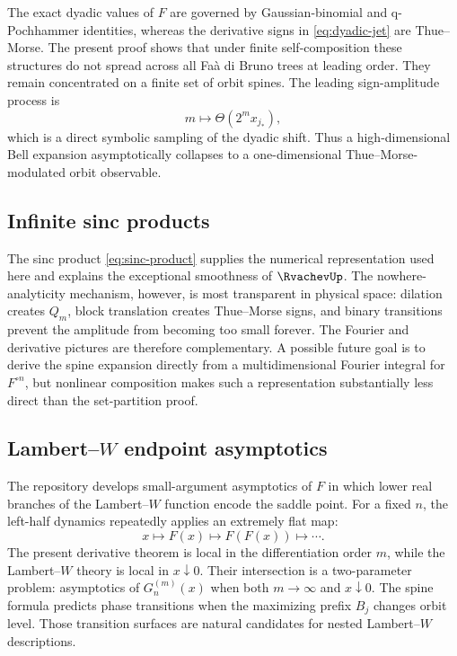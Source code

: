 \documentclass[11pt,oneside]{article}
\theoremstyle{definition}
\theoremstyle{remark}
\newcommand{\comp}{\mathbin{\circ}}
\newcommand{\ThetaF}{\Theta}
\begin{document}
The exact dyadic values of $F$ are governed by Gaussian-binomial and q-Pochhammer
identities, whereas the derivative signs in \eqref{eq:dyadic-jet} are Thue--Morse.
The present proof shows that under finite self-composition these structures do not
spread across all Fa\`a di Bruno trees at leading order.  They remain concentrated on
a finite set of orbit spines.  The leading sign-amplitude process is
\begin{equation}
 m\longmapsto
 \ThetaF(2^m x_{j_*}),
 \label{eq:leading-symbolic-process}
\end{equation}
which is a direct symbolic sampling of the dyadic shift.  Thus a high-dimensional
Bell expansion asymptotically collapses to a one-dimensional Thue--Morse-modulated
orbit observable.

\subsection{Infinite sinc products}

The sinc product \eqref{eq:sinc-product} supplies the numerical representation used
here and explains the exceptional smoothness of $\RvachevUp$.  The nowhere-analyticity
mechanism, however, is most transparent in physical space: dilation creates $Q_m$,
block translation creates Thue--Morse signs, and binary transitions prevent the
amplitude from becoming too small forever.  The Fourier and derivative pictures are
therefore complementary.  A possible future goal is to derive the spine expansion
directly from a multidimensional Fourier integral for $F^{\comp n}$, but nonlinear
composition makes such a representation substantially less direct than the
set-partition proof.

\subsection[Lambert-W endpoint asymptotics]{Lambert--$W$ endpoint asymptotics}

The repository develops small-argument asymptotics of $F$ in which lower real branches
of the Lambert--$W$ function encode the saddle point.  For a fixed $n$, the left-half
dynamics repeatedly applies an extremely flat map:
\begin{equation}
 x\mapsto F(x)\mapsto F(F(x))\mapsto\cdots.
 \label{eq:nested-flat-map}
\end{equation}
The present derivative theorem is local in the differentiation order $m$, while the
Lambert--$W$ theory is local in $x\downarrow0$.  Their intersection is a two-parameter
problem: asymptotics of $G_n^{(m)}(x)$ when both $m\to\infty$ and $x\downarrow0$.
The spine formula predicts phase transitions when the maximizing prefix $B_j$ changes
orbit level.  Those transition surfaces are natural candidates for nested
Lambert--$W$ descriptions.
\end{document}
